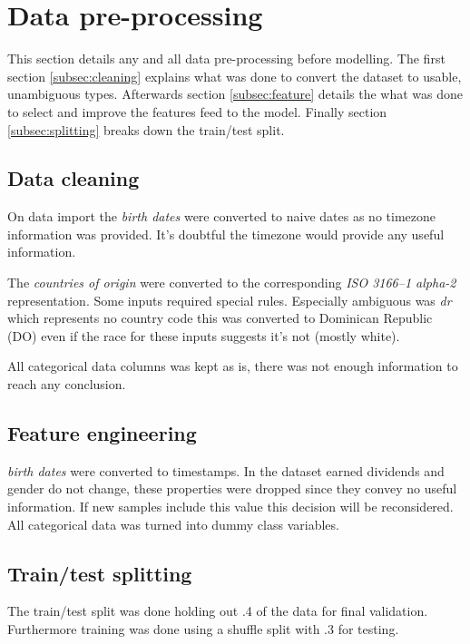 \section{Data pre-processing}
\label{sec:data}

This section details any and all data pre-processing before modelling.
The first section \vref{subsec:cleaning} explains what was done to
convert the dataset to usable, unambiguous types.
Afterwards section \vref{subsec:feature} details the what was
done to select and improve the features feed to the model.
Finally section \vref{subsec:splitting} breaks down the train/test split.


\subsection{Data cleaning}
\label{subsec:cleaning}

On data import the \emph{birth dates} were converted to naive dates as no
timezone information was provided.
It's doubtful the timezone would provide any useful information.

The \emph{countries of origin} were converted
to the corresponding \emph{ISO 3166--1 alpha-2} representation.
Some inputs required special rules.
Especially ambiguous was \emph{dr} which
represents no country code this was converted to Dominican Republic (DO)
even if the race for these inputs suggests it's not (mostly white).

All categorical data columns was kept as is, there was not enough information
to reach any conclusion.


\subsection{Feature engineering}
\label{subsec:feature}

\emph{birth dates} were converted to timestamps.
In the dataset earned dividends and gender do not change,
these properties were dropped since they convey no useful information.
If new samples include this value this decision will be reconsidered.
All categorical data was turned into dummy class variables.


\subsection{Train/test splitting}
\label{subsec:splitting}

The train/test split was done holding out .4 of the data for final
validation.
Furthermore training was done using a shuffle split with .3 for testing.

